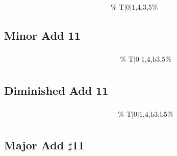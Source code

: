 \documentclass[english]{./gbook}
\begin{document}
\begin{large}
\[\begin{array}{ll}
&
	\text{
	}
\end{array}
\]

\subsection*{Minor Add 11}

\[
\begin{array}{ll}
	\begin{array}{c}
		\begin{array}{ccc}
			&%
			&%
		\end{array}
		\\
		\begin{array}{cc}
			&%
		\end{array}
	\end{array}

&
	\text{
	}
\end{array}
\]


\subsection*{Diminished Add 11}

\[
\begin{array}{ll}
	\begin{array}{c}
		\begin{array}{ccc}
			&%
			&%
		\end{array}
		\\
		\begin{array}{cc}
			&%
		\end{array}
	\end{array}

&
	\text{
	}
\end{array}
\]

\subsection*{Major Add $\sharp$11}

\[
\begin{array}{ll}
	\begin{array}{c}
		\begin{array}{ccc}
			&%
			&%
		\end{array}
		\\
		\begin{array}{cc}
			&%
		\end{array}
	\end{array}


\end{array}\]
\end{large}
\end{document}
